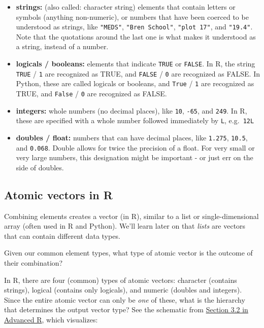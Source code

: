 \documentclass[
]{book}
\begin{document}
\begin{itemize}
\item
  \textbf{strings:} (also called: character string) elements that contain letters or symbols (anything non-numeric), or numbers that have been coerced to be understood as strings, like \texttt{"MEDS"}, \texttt{"Bren\ School"}, \texttt{"plot\ 17"}, and \texttt{"19.4"}. Note that the quotations around the last one is what makes it understood as a string, instead of a number.
\item
  \textbf{logicals / booleans:} elements that indicate \texttt{TRUE} or \texttt{FALSE}. In R, the string \texttt{TRUE} / \texttt{1} are recognized as TRUE, and \texttt{FALSE} / \texttt{0} are recognized as FALSE. In Python, these are called logicals or booleans, and \texttt{True} / \texttt{1} are recognized as TRUE, and \texttt{False} / \texttt{0} are recognized as FALSE.
\item
  \textbf{integers:} whole numbers (no decimal places), like \texttt{10}, \texttt{-65}, and \texttt{249}. In R, these are specified with a whole number followed immediately by \texttt{L}, e.g.~\texttt{12L}
\item
  \textbf{doubles / float:} numbers that can have decimal places, like \texttt{1.275}, \texttt{10.5}, and \texttt{0.068}. Double allows for twice the precision of a float. For very small or very large numbers, this designation might be important - or just err on the side of doubles.
\end{itemize}

\hypertarget{atomic-vectors-in-r}{%
\subsection{Atomic vectors in R}\label{atomic-vectors-in-r}}

Combining elements creates a vector (in R), similar to a list or single-dimensional array (often used in R and Python). We'll learn later on that \emph{lists} are vectors that can contain different data types.

Given our common element types, what type of atomic vector is the outcome of their combination?

In R, there are four (common) types of atomic vectors: character (contains strings), logical (contains only logicals), and numeric (doubles and integers). Since the entire atomic vector can only be \emph{one} of these, what is the hierarchy that determines the output vector type? See the schematic from \href{https://adv-r.hadley.nz/vectors-chap.html\#atomic-vectors}{Section 3.2 in Advanced R}, which visualizes:
\end{document}
